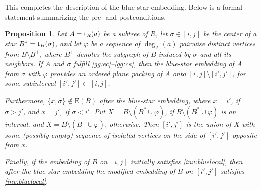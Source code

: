 \documentclass[11pt,a4paper,colorlinks=true,urlcolor=blue,citecolor=red]{article}
\theoremstyle{plain}
\newtheorem{proposition}[theorem]{Proposition}
\newcommand{\EB}{\mathrm{E}(B)}
\begin{document}
This completes the description of the blue-star embedding. Below is a
formal statement summarizing the pre- and postconditions.
\begin{proposition}\label{p:greedygrab}
  Let $A=\mathrm t_R(a)$ be a subtree of $R$, let $\sigma\in[i,j]$ be the
  center of a star $B^*=\mathrm t_B(\sigma)$, and let $\varphi$ be a sequence
  of $\deg_A(a)$ pairwise distinct vertices from $B\setminus B^+$, where
  $B^+$ denotes the subgraph of $B$ induced by $\sigma$ and all its
  neighbors. If $A$ and $\sigma$ fulfill \ref{gg:ec}--\ref{gg:cs}, then
  the blue-star embedding of $A$ from $\sigma$ with $\varphi$ provides
  an ordered plane packing of $A$ onto $[i,j]\setminus[i',j']$, for some
  subinterval $[i',j']\subset[i,j]$.

  Furthermore, $\{x,\sigma\}\notin\EB$ after the blue-star
  embedding, where $x=i'$, if $\sigma>j'$, and $x=j'$, if
  $\sigma<i'$. Put $X=B\setminus(B^*\cup\varphi)$, if
  $B\setminus(B^*\cup\varphi)$ is an interval, and
  $X=B\setminus(B^+\cup\varphi)$, otherwise. Then $[i',j']$ is the union
  of $X$ with some (possibly empty) sequence of isolated vertices on the
  side of $[i',j']$ opposite from $x$.

  Finally, if the embedding of $B$ on $[i,j]$ initially satisfies
  \ref{inv:bluelocal}, then after the blue-star embedding the modified
  embedding of $B$ on $[i',j']$ satisfies \ref{inv:bluelocal}.
\end{proposition}
\end{document}
